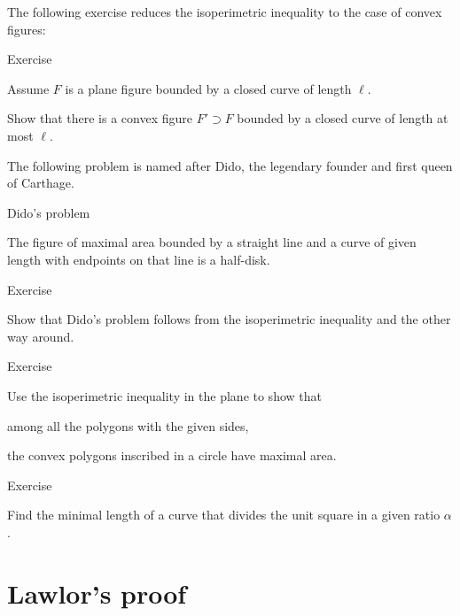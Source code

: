 The following exercise reduces the isoperimetric inequality to the case of convex figures:



\begin{thm}{Exercise}

Assume $F$ is a plane figure bounded by a closed curve of length $\ell$.

Show that there is a convex figure $F'\supset F$ bounded by a closed curve of length at most $\ell$.

\end{thm}



The following problem is named after Dido, the legendary founder and first queen of Carthage.



\begin{thm}{Dido's problem}

The figure of maximal area bounded by a straight line and a curve of given length with endpoints on that line is a half-disk.

\end{thm}



\begin{thm}{Exercise}\label{ex:dido-isop}

Show that Dido's problem follows from the isoperimetric inequality and the other way around.

\end{thm}





\begin{thm}{Exercise}

Use the isoperimetric inequality in the plane to show that 

among all the polygons with the given sides,

the convex polygons inscribed in a circle have maximal area.

\end{thm}



\begin{thm}{Exercise}

Find the minimal length of a curve that divides the unit square in a given ratio $\alpha$.  

\end{thm}



\section{Lawlor's proof}



